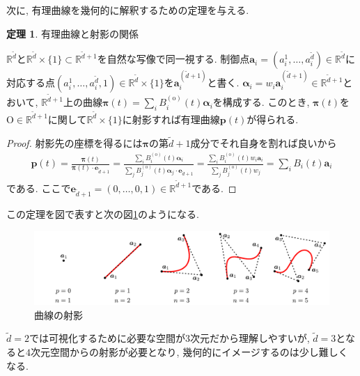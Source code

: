 \documentclass{jsarticle}
\newcommand\setR{\mathbb{R}}
\theoremstyle{definition}%
\newtheorem{thm}{定理}
\begin{document}
\newpage
次に, 有理曲線を幾何的に解釈するための定理を与える.
\begin{screen}
	\begin{thm}
		有理曲線と射影の関係

		$\mathbb{R}^{\tilde{d}}$と$\mathbb{R}^{\tilde{d}}\times\{1\}\subset\mathbb{R}^{{\tilde{d}}+1}$を自然な写像で同一視する.
		制御点$\bm{a}_i=(a_i^1,\dots,a_i^{\tilde{d}})\in\mathbb{R}^{\tilde{d}}$に対応する点$(a_i^1,\dots,a_i^{\tilde{d}},1)\in\mathbb{R}^{\tilde{d}}\times\{1\}$を$\bm{a}_i^{({\tilde{d}}+1)}$と書く.
		$\bm{\alpha}_i=w_i \bm{a}_i^{({\tilde{d}}+1)}\in\setR^{\tilde{d}+1}$とおいて, $\mathbb{R}^{{\tilde{d}}+1}$上の曲線$\bm{\pi}(t)=\sum\limits_iB_i^{(\text{o})}(t)\bm{\alpha}_i$を構成する.
		このとき, $\bm{\pi}(t)$を$\mathrm{O}\in\mathbb{R}^{{\tilde{d}}+1}$に関して$\mathbb{R}^{\tilde{d}}\times\{1\}$に射影すれば有理曲線$\bm{p}(t)$が得られる.
	\end{thm}
\end{screen}
\begin{proof}
	射影先の座標を得るには$\bm{\pi}$の第${\tilde{d}}+1$成分でそれ自身を割れば良いから
	\begin{align}
		\bm{p}(t)
		=\frac{\bm{\pi}(t)}{\bm{\pi}(t)\cdot \bm{e}_{\tilde{d}+1}}
		=\frac{\sum\limits_i B_i^{(\text{o})}(t)\bm{\alpha}_i}{\sum\limits_j B_j^{(\text{o})}(t)\bm{\alpha}_j\cdot\bm{e}_{\tilde{d}+1}}
		=\frac{\sum\limits_i B_i^{(\text{o})}(t)w_i\bm{a}_i}{\sum\limits_j B_j^{(\text{o})}(t)w_j}
		=\sum_i {B}_i(t)\bm{a}_i
	\end{align}
	である.
	ここで$\bm{e}_{\tilde{d}+1}=(0,\dots,0,1)\in\mathbb{R}^{\tilde{d}+1}$である.
\end{proof}

この定理を図で表すと次の図\ref{Fig201}のようになる.
\begin{figure}[H]
	\centering
    \includegraphics[page=4,clip,width=120mm]{fig.pdf}
	\caption{曲線の射影}
	\label{Fig201}
\end{figure}
\noindent
$\tilde{d}=2$では可視化するために必要な空間が3次元だから理解しやすいが, $\tilde{d}=3$となると$4$次元空間からの射影が必要となり, 幾何的にイメージするのは少し難しくなる.
\end{document}
